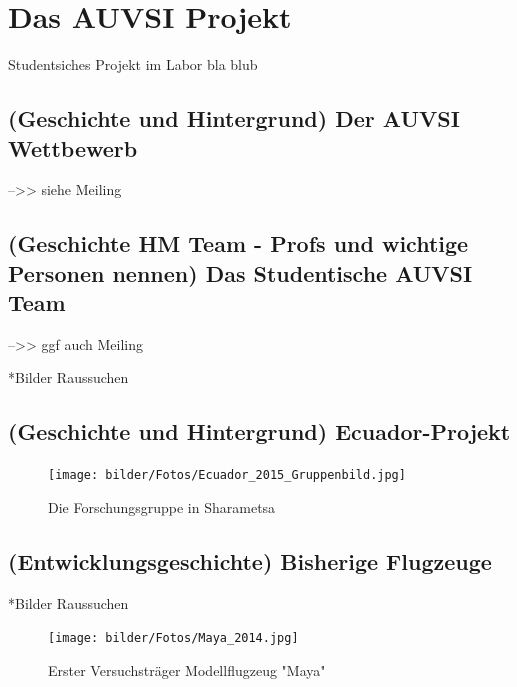 \chapter{Das AUVSI Projekt}\label{cha:Das AUVSI Projekt}

Studentsiches Projekt im Labor  bla blub

\section{(Geschichte und Hintergrund) Der AUVSI Wettbewerb}

-->> siehe Meiling 

\section{(Geschichte HM Team - Profs und wichtige Personen nennen) Das Studentische AUVSI Team}

-->> ggf auch Meiling

*Bilder Raussuchen

\section{(Geschichte und Hintergrund) Ecuador-Projekt}

\begin{figure}[H]
\centering
\texttt{[image: bilder/Fotos/Ecuador\_2015\_Gruppenbild.jpg]} 
\caption{Die Forschungsgruppe in Sharametsa} 
\label{Die Forschungsgruppe in Sharametsa}
\end{figure}

\section{(Entwicklungsgeschichte) Bisherige Flugzeuge}

*Bilder Raussuchen

\begin{figure}[H]
\centering
\texttt{[image: bilder/Fotos/Maya\_2014.jpg]} 
\caption{Erster Versuchsträger Modellflugzeug "Maya"} 
\label{Erster Versuchsträger Modellflugzeug "Maya"}
\end{figure}

